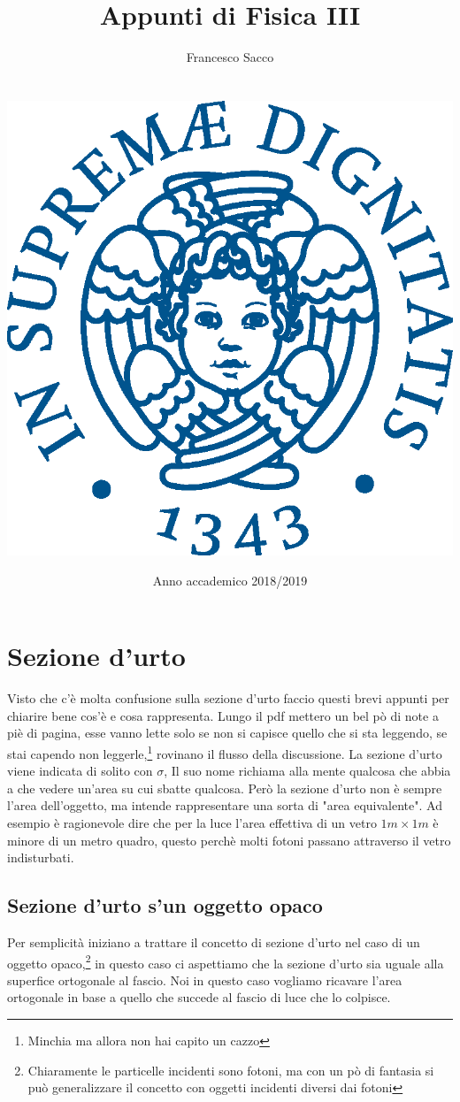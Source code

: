 \documentclass[11pt,a4paper]{report}
\date{{\LARGE Anno accademico 2018/2019}}
\title{{\myfont Appunti di Fisica III}}
\author{{\Huge Francesco Sacco}\\ \\ \\
		\includegraphics[scale=0.8]{Immagini/cherubino.eps}\\}
\begin{document}
\maketitle
\tableofcontents
\newpage
\chapter{Sezione d'urto}
	Visto che c'è molta confusione sulla sezione d'urto faccio questi brevi appunti per chiarire bene cos'è e cosa rappresenta.\newline
	Lungo il pdf mettero un bel pò di note a piè di pagina, esse vanno lette solo se non si capisce quello che si sta leggendo, se stai capendo non leggerle,\footnote{Minchia ma allora non hai capito un cazzo} rovinano il flusso della discussione.\newline 
	La sezione d'urto viene indicata di solito con $\sigma$, Il suo nome richiama alla mente qualcosa che abbia a che vedere un'area su cui sbatte qualcosa. Però la sezione d'urto non è sempre l'area dell'oggetto, ma intende rappresentare una sorta di "area equivalente".\newline
	Ad esempio è ragionevole dire che per la luce l'area effettiva di un vetro $1m\times 1m$ è minore di un metro quadro, questo perchè molti fotoni passano attraverso il vetro indisturbati.\newline
	\section{Sezione d'urto s'un oggetto opaco}
	\label{sec:opaco}
		Per semplicità iniziano a trattare il concetto di sezione d'urto nel caso di un oggetto opaco,\footnote{Chiaramente le particelle incidenti sono fotoni, ma con un pò di fantasia si può generalizzare il concetto con oggetti incidenti diversi dai fotoni} in questo caso ci aspettiamo che la sezione d'urto sia uguale alla superfice ortogonale al fascio.\newline
		Noi in questo caso vogliamo ricavare l'area ortogonale in base a quello che succede al fascio di luce che lo colpisce.\newline
\end{document}
